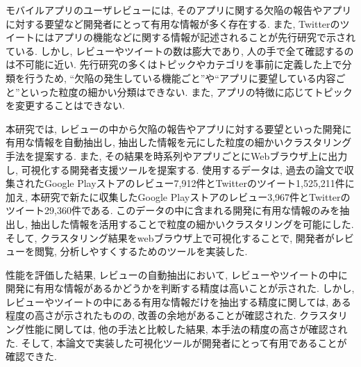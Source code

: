 
モバイルアプリのユーザレビューには, そのアプリに関する欠陥の報告やアプリに対する要望など開発者にとって有用な情報が多く存在する. また, Twitterのツイートにはアプリの機能などに関する情報が記述されることが先行研究で示されている. しかし, レビューやツイートの数は膨大であり, 人の手で全て確認するのは不可能に近い. 
先行研究の多くはトピックやカテゴリを事前に定義した上で分類を行うため, ``欠陥の発生している機能ごと''や``アプリに要望している内容ごと''といった粒度の細かい分類はできない. また, アプリの特徴に応じてトピックを変更することはできない. 

本研究では, レビューの中から欠陥の報告やアプリに対する要望といった開発に有用な情報を自動抽出し, 抽出した情報を元にした粒度の細かいクラスタリング手法を提案する. また, その結果を時系列やアプリごとにWebブラウザ上に出力し, 可視化する開発者支援ツールを提案する.
使用するデータは, 過去の論文で収集されたGoogle Playストアのレビュー7,912件とTwitterのツイート1,525,211件に加え, 本研究で新たに収集したGoogle Playストアのレビュー3,967件とTwitterのツイート29,360件である. このデータの中に含まれる開発に有用な情報のみを抽出し, 抽出した情報を活用することで粒度の細かいクラスタリングを可能にした. 
そして, クラスタリング結果をwebブラウザ上で可視化することで, 開発者がレビューを閲覧, 分析しやすくするためのツールを実装した. 

性能を評価した結果, レビューの自動抽出において, レビューやツイートの中に開発に有用な情報があるかどうかを判断する精度は高いことが示された. 
しかし, レビューやツイートの中にある有用な情報だけを抽出する精度に関しては, ある程度の高さが示されたものの, 改善の余地があることが確認された. 
クラスタリング性能に関しては, 他の手法と比較した結果, 本手法の精度の高さが確認された. 
そして, 本論文で実装した可視化ツールが開発者にとって有用であることが確認できた. 
